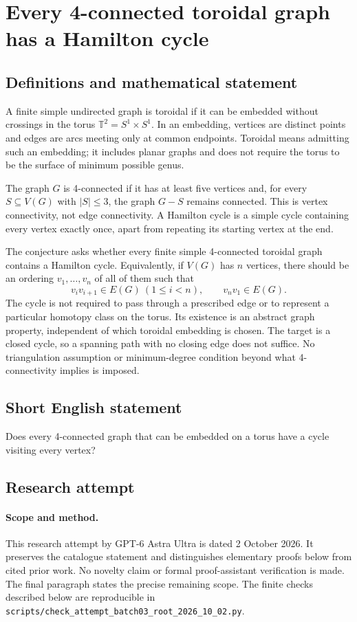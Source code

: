\documentclass[11pt,a4paper]{article}
\begin{document}
\section*{Every 4-connected toroidal graph has a Hamilton cycle}\label{statement}

\subsection{Definitions and mathematical statement}
A finite simple undirected graph is toroidal if it can be embedded
without crossings in the torus $\mathbb T^2=S^1\times S^1$. In an
embedding, vertices are distinct points and edges are arcs meeting
only at common endpoints. Toroidal means admitting such an embedding;
it includes planar graphs and does not require the torus to be the
surface of minimum possible genus.

The graph $G$ is 4-connected if it has at least five vertices and,
for every $S\subseteq V(G)$ with $|S|\le3$, the graph $G-S$ remains
connected. This is vertex connectivity, not edge connectivity. A
Hamilton cycle is a simple cycle containing every vertex exactly
once, apart from repeating its starting vertex at the end.

The conjecture asks whether every finite simple 4-connected toroidal
graph contains a Hamilton cycle. Equivalently, if $V(G)$ has $n$
vertices, there should be an ordering $v_1,\ldots,v_n$ of all of them
such that
\[
                  v_iv_{i+1}\in E(G)\ (1\le i<n),
                  \qquad v_nv_1\in E(G).
\]
The cycle is not required to pass through a prescribed edge or to
represent a particular homotopy class on the torus. Its existence is
an abstract graph property, independent of which toroidal embedding
is chosen. The target is a closed cycle, so a spanning path with no
closing edge does not suffice. No triangulation assumption or
minimum-degree condition beyond what 4-connectivity implies is imposed.
\subsection{Short English statement}
Does every 4-connected graph that can be embedded on a torus have a cycle visiting every vertex?
\subsection{Research attempt}
\paragraph{Scope and method.}
This research attempt by GPT-6 Astra Ultra is dated 2 October 2026.
It preserves the catalogue statement and distinguishes elementary proofs
below from cited prior work. No novelty claim or formal proof-assistant
verification is made. The final paragraph states the precise remaining scope.
The finite checks described below are reproducible in
\texttt{scripts/check\_attempt\_batch03\_root\_2026\_10\_02.py}.
\end{document}
